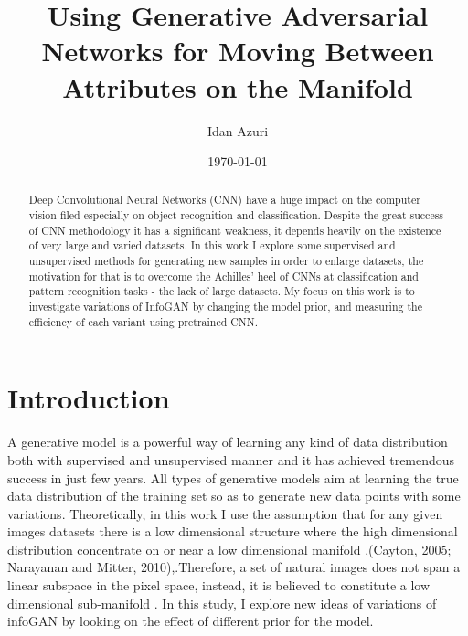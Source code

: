 \documentclass[letterpaper,12pt]{article}
\begin{document}
\title{Using Generative Adversarial Networks for Moving Between Attributes on the Manifold}
\author{Idan Azuri}
\date{\today}
\maketitle

\begin{abstract}
Deep Convolutional Neural Networks (CNN) have a huge impact on the computer vision filed especially on object recognition and classification. Despite the great success of CNN methodology it has  a significant weakness, it depends heavily on the existence of very large and varied datasets.
In this work I explore some supervised and unsupervised methods for generating new samples in order to enlarge datasets, the motivation for that is to overcome the Achilles' heel of CNNs at classification and pattern recognition tasks - the lack of large datasets. My focus on this work is to investigate variations of InfoGAN by changing the model prior, and measuring the efficiency of each variant using pretrained CNN. 

\end{abstract}


\section{Introduction}

 A generative model is a powerful way of learning any kind of data distribution both with supervised and unsupervised manner and it has achieved tremendous success in just few years.  All types of generative models aim at learning the true data distribution of the training set so as to generate new data points with some variations. Theoretically, in this work I use the assumption that for any given images datasets there is a low dimensional structure where the high dimensional distribution concentrate on or near a low dimensional manifold  ,(Cayton, 2005; Narayanan and Mitter, 2010)\cite{NIPS2011_4409},\cite{Bengio-et-al-2015-Book}.Therefore, a set of natural images does not span a linear subspace in the pixel space, instead, it is believed to constitute a low dimensional sub-manifold \cite{pmlr-v28-bengio13}.\newline
In this study, I explore new ideas of variations of infoGAN \cite{NIPS2016_6399} by looking on the effect of different prior for the model. 
\end{document}
